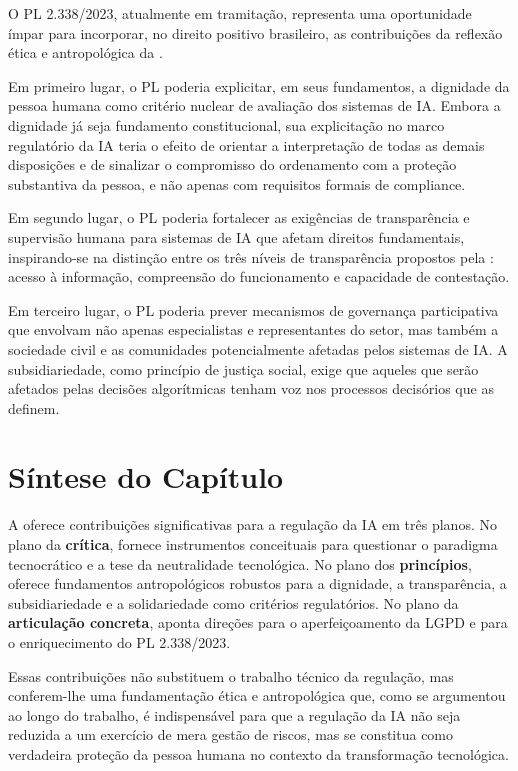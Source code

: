 O PL 2.338/2023, atualmente em tramitação, representa uma oportunidade ímpar para incorporar, no direito positivo brasileiro, as contribuições da reflexão ética e antropológica da \MH{}.

Em primeiro lugar, o PL poderia explicitar, em seus fundamentos, a dignidade da pessoa humana como critério nuclear de avaliação dos sistemas de IA. Embora a dignidade já seja fundamento constitucional, sua explicitação no marco regulatório da IA teria o efeito de orientar a interpretação de todas as demais disposições e de sinalizar o compromisso do ordenamento com a proteção substantiva da pessoa, e não apenas com requisitos formais de compliance.

Em segundo lugar, o PL poderia fortalecer as exigências de transparência e supervisão humana para sistemas de IA que afetam direitos fundamentais, inspirando-se na distinção entre os três níveis de transparência propostos pela \MH{}: acesso à informação, compreensão do funcionamento e capacidade de contestação.

Em terceiro lugar, o PL poderia prever mecanismos de governança participativa que envolvam não apenas especialistas e representantes do setor, mas também a sociedade civil e as comunidades potencialmente afetadas pelos sistemas de IA. A subsidiariedade, como princípio de justiça social, exige que aqueles que serão afetados pelas decisões algorítmicas tenham voz nos processos decisórios que as definem.

\section{Síntese do Capítulo}
\label{sec:sumario-cap5}

A \MH{} oferece contribuições significativas para a regulação da IA em três planos. No plano da \textbf{crítica}, fornece instrumentos conceituais para questionar o paradigma tecnocrático e a tese da neutralidade tecnológica. No plano dos \textbf{princípios}, oferece fundamentos antropológicos robustos para a dignidade, a transparência, a subsidiariedade e a solidariedade como critérios regulatórios. No plano da \textbf{articulação concreta}, aponta direções para o aperfeiçoamento da LGPD e para o enriquecimento do PL 2.338/2023.

Essas contribuições não substituem o trabalho técnico da regulação, mas conferem-lhe uma fundamentação ética e antropológica que, como se argumentou ao longo do trabalho, é indispensável para que a regulação da IA não seja reduzida a um exercício de mera gestão de riscos, mas se constitua como verdadeira proteção da pessoa humana no contexto da transformação tecnológica.
